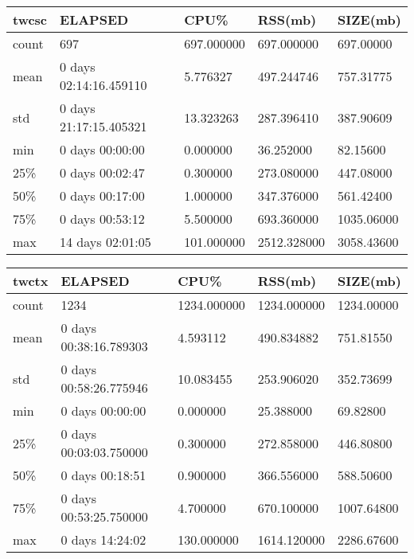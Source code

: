 \documentclass{article}
\begin{document}
\begin{table}[H]
\begin{tabular}{|l|l|l|l|l|}
\hline twcsc& ELAPSED&   CPU\%&  RSS(mb)&   SIZE(mb) \\
\hline count&    697& 697.000000&  697.000000&  697.00000 \\
\hline mean&  0 days 02:14:16.459110&  5.776327&  497.244746&  757.31775 \\
\hline std&  0 days 21:17:15.405321&  13.323263&  287.396410&  387.90609 \\
\hline min&   0 days 00:00:00&  0.000000&  36.252000&  82.15600 \\
\hline 25\%&   0 days 00:02:47&  0.300000&  273.080000&  447.08000 \\
\hline 50\%&   0 days 00:17:00&  1.000000&  347.376000&  561.42400 \\
\hline 75\%&   0 days 00:53:12&  5.500000&  693.360000& 1035.06000 \\
\hline max&  14 days 02:01:05& 101.000000& 2512.328000& 3058.43600 \\
\hline 
\end{tabular}
\label{TABLE-SessionSizetwcsc}
\end{table}

\begin{table}[H]
\begin{tabular}{|l|l|l|l|l|}
\hline twctx& ELAPSED&  CPU\%&  RSS(mb)&  SIZE(mb) \\
\hline count&   1234& 1234.000000& 1234.000000& 1234.00000 \\
\hline mean&  0 days 00:38:16.789303&   4.593112&  490.834882&  751.81550 \\
\hline std&  0 days 00:58:26.775946&  10.083455&  253.906020&  352.73699 \\
\hline min&   0 days 00:00:00&   0.000000&  25.388000&  69.82800 \\
\hline 25\%&  0 days 00:03:03.750000&   0.300000&  272.858000&  446.80800 \\
\hline 50\%&   0 days 00:18:51&   0.900000&  366.556000&  588.50600 \\
\hline 75\%&  0 days 00:53:25.750000&   4.700000&  670.100000& 1007.64800 \\
\hline max&   0 days 14:24:02&  130.000000& 1614.120000& 2286.67600 \\
\hline 
\end{tabular}
\label{TABLE-SessionSizetwctx}
\end{table}
\end{document}
